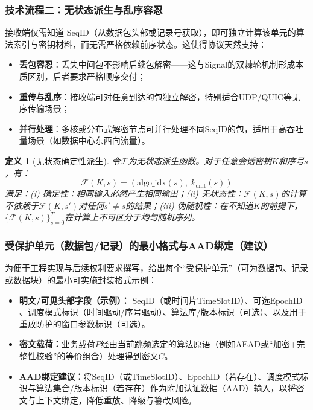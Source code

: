 \documentclass[12pt,a4paper]{article}
\newtheorem{definition}{定义}
\begin{document}
\subsubsection{技术流程二：无状态派生与乱序容忍}

接收端仅需知道 $\text{SeqID}$（从数据包头部或记录号获取），即可独立计算该单元的算法索引与密钥材料，而无需严格依赖前序状态。这使得协议天然支持：

\begin{itemize}
    \item \textbf{丢包容忍}：丢失中间包不影响后续包解密——这与Signal的双棘轮机制形成本质区别，后者要求严格顺序交付；
    \item \textbf{重传与乱序}：接收端可对任意到达的包独立解密，特别适合UDP/QUIC等无序传输场景；
    \item \textbf{并行处理}：多核或分布式解密节点可并行处理不同$\text{SeqID}$的包，适用于高吞吐量场景（如数据中心东西向流量）。
\end{itemize}

\begin{definition}[无状态确定性派生]
令$\mathcal{F}$为无状态派生函数。对于任意会话密钥$K$和序号$s$，有：
\[
\mathcal{F}(K, s) = (\text{algo\_idx}(s), \; k_{\text{unit}}(s))
\]
满足：(i) 确定性：相同输入必然产生相同输出；(ii) 无状态性：$\mathcal{F}(K, s)$的计算不依赖于$\mathcal{F}(K, s')$对任何$s' \neq s$的结果；(iii) 伪随机性：在不知道$K$的前提下，$\{\mathcal{F}(K, s)\}_{s=0}^{T}$在计算上不可区分于均匀随机序列。
\end{definition}

\subsubsection{受保护单元（数据包/记录）的最小格式与AAD绑定（建议）}

为便于工程实现与后续权利要求撰写，给出每个“受保护单元”（可为数据包、记录或数据块）的最小可实施封装格式示例：

\begin{itemize}
    \item \textbf{明文/可见头部字段（示例）：} $\text{SeqID}$（或时间片$\text{TimeSlotID}$）、可选$\text{EpochID}$、调度模式标识（时间驱动/序号驱动）、算法库/版本标识（可选）、以及用于重放防护的窗口参数标识（可选）。
    \item \textbf{密文载荷：}业务载荷$P$经由当前跳频选定的算法原语（例如AEAD或“加密+完整性校验”的等价组合）处理得到密文$C$。
    \item \textbf{AAD绑定建议：}将$\text{SeqID}$（或$\text{TimeSlotID}$）、$\text{EpochID}$（若存在）、调度模式标识与算法集合/版本标识（若存在）作为附加认证数据（AAD）输入，以将密文与上下文绑定，降低重放、降级与篡改风险。
\end{itemize}
\end{document}
